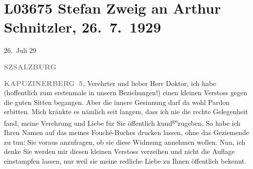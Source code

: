 

\section[Stefan Zweig an Arthur Schnitzler, 26. 7. 1929]{L03675 Stefan Zweig an Arthur Schnitzler, 26. 7. 1929}
\nopagebreak{}
\rehead{ }\normalsize\beginnumbering{}
\toendnotes[C]{\smallbreak\pagebreak[2]}
\toendnotes[C]{\smallbreak}
\pstart
           \raggedleft{}{\pb}26. Juli 29\pend
           
\pstart
           \textcolor{gray}{\textbf{SZ}}\hfill \textcolor{gray}{\textbf{SALZBURG}}\pend
           
\pstart
           \raggedleft{}\textcolor{gray}{\textbf{KAPUZINERBERG 5,}}\pend
           \vspace{0.5em}
\pstart
           Verehrter und lieber Herr Doktor, ich habe (hoffentlich zum
               erstenmale in unsern Beziehungen!) einen kleinen Verstoss gegen die guten Sitten
               begangen. Aber die innere Gesinnung darf da wohl Pardon erbitten. Mich kränkte es
               nämlich seit langem, dass ich nie die rechte Gelegenheit fand, meine Verehrung und
               Liebe für Sie öffentlich kund\substVorne{}\textsuperscript{ge}\substDazwischen{}zu\substHinten{}geben. So habe ich Ihren Namen auf das \label{K_L03675-1v}\label{K_L03675-1} meines Fouché-Buches drucken {\pb}lassen,
               ohne das Geziemende zu tun: Sie voraus anzufragen, ob sie diese Widmung annehmen
               wollen. Nun, ich denke Sie werden mir diesen kleinen Verstoss verzeihen und nicht die
               Auflage einstampfen lassen, nur weil sie meine redliche Liebe zu Ihnen öffentlich
               bekennt.\pend
           
